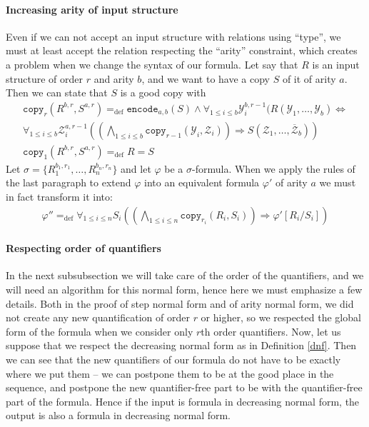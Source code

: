 \documentclass[a4paper,12pt]{article}
\theoremstyle{definition}
\renewcommand{\phi}{\varphi}
\newcommand{\mc}{\mathcal}
\newcommand{\olmc}[1]{\overline{\mathcal{#1}}}
\newcommand{\ed}{=_{\mathrm{def}}}
\begin{document}
\paragraph{Increasing arity of input structure}
Even if we can not accept an input structure with relations using
``type'', we must at least accept the relation respecting the
``arity'' constraint, which creates a problem when we change the
syntax of our formula. Let say that $R$ is an input structure of order
$r$ and arity $b$, and we want to have a copy $S$ of it of arity
$a$. Then we can state that $S$ is a good copy with
\begin{eqnarray}
  \texttt{copy}_{r}(R^{b,r},S^{a,r})\ed\texttt{encode}_{a,b}(S)\land\forall_{1\le i\le b} \mc Y_{i}^{b,r-1}(R(\mc Y_{1},\dots,\mc Y_{b})\Leftrightarrow\nonumber\\
  \forall_{1\le i\le b}\mc Z_{i}^{a,r-1}((\bigwedge_{{1\le i\le b}}\texttt{copy}_{r-1}(\mc Y_{i},\mc Z_{i}))\Rightarrow S(\mc Z_{1},\dots,\olmc Z_{b}))\\
  \texttt{copy}_{1}(R^{b,r},S^{a,r})\ed R=S
\end{eqnarray}
Let $\sigma=\{R_{1}^{b_{1},r_{1}},\dots,R_{n}^{b_{n},r_{n}}\}$ and let
$\phi$ be a $\sigma$-formula. When we apply the rules of the last
paragraph to extend $\phi$ into an equivalent formula $\phi'$ of arity
$a$ we must in fact transform it into:
\begin{eqnarray}
  \phi''\ed\forall_{1\le i\le n}S_{i}((\bigwedge_{1\le i\le n}\texttt{copy}_{r_{i}}(R_{i},S_{i}))\Rightarrow \phi'[R_{i}/S_{i}])
\end{eqnarray}
\paragraph{Respecting order of quantifiers}
In the next subsubsection we will take care of the order of the
quantifiers, and we will need an algorithm for this normal form, hence
here we must emphasize a few details. Both in the proof of step normal
form and of arity normal form, we did not create any new
quantification of order $r$ or higher, so we respected the global form
of the formula when we consider only $r$th order quantifiers. Now, let
us suppose that we respect the decreasing normal form as in Definition
\ref{dnf}. Then we can see that the new quantifiers of our formula do
not have to be exactly where we put them -- we can postpone them to be
at the good place in the sequence, and postpone the new quantifier-free
part to be with the quantifier-free part of the formula. Hence if the
input is formula in decreasing normal form, the output is also a
formula in decreasing normal form.
\end{document}
